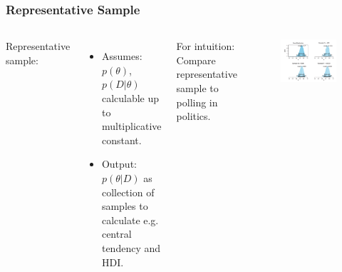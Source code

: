 \documentclass[usenames,dvipsnames,table]{beamer}
\begin{document}
\begin{frame}
\frametitle{Representative Sample}
\begin{columns}[c]
Representative sample:
\begin{itemize}
\item Assumes: $p(\theta)$, $p(D|\theta)$ calculable up to multiplicative constant.
\item Output: $p(\theta|D)$ as collection of samples to calculate e.g. central tendency and HDI.
\end{itemize}

For intuition: Compare representative sample to polling in politics.
\begin{figure}
\centering
\includegraphics[height=0.6\textheight]{img/fig7_1}
\end{figure}
\end{columns}
\end{frame}
\end{document}
